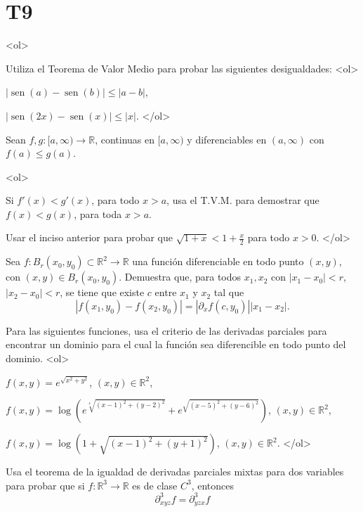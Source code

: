 \documentclass{article}
\theoremstyle{definition}
\newcommand{\sen}{\operatorname{sen}}
\begin{document}
  \section*{T9 }


  <ol>



  \item\label{Ejer:DesigualdadesAplicandoTVM}
    Utiliza el Teorema de Valor Medio para probar las siguientes desigualdades:
<ol>
\item $|\sen(a)-\sen(b)| \leq |a-b|$,
\item $|\sen(2x)-\sen(x)| \leq |x|$.
</ol>


\item Sean $f,g:[a,\infty)\to \mathbb{R}$, continuas en $[a,\infty)$ y diferenciables en $(a,\infty)$ con
$f(a) \leq g(a)$.

<ol>
\item Si $f'(x) < g'(x)$, para todo $x>a$, usa el T.V.M. para demostrar que $f(x) < g(x)$, para toda $x>a$.
\item Usar el inciso anterior para probar que $\sqrt{1+x}< 1+\frac{x}{2}$ para todo $x>0$.
</ol>    
  
\item Sea $f:B_r(x_0,y_0)\subset \mathbb{R}^2 \to \mathbb{R}$ una función diferenciable en todo
  punto $(x,y)$, con $(x,y)\in B_r(x_0,y_0)$. Demuestra que, para todos $x_1,x_2$ con $|x_1-x_0|<r$,
  $|x_2-x_0|<r$, se tiene que existe $c$ entre $x_1$ y $x_2$ tal que
  $$
  |f(x_1,y_0)-f(x_2,y_0)| = |\partial_xf(c,y_0)||x_1-x_2|.
  $$

  \item Para las siguientes funciones, usa el criterio
    de las derivadas parciales para encontrar  un dominio
    para el cual la función sea diferencible en
    todo punto del dominio.
    <ol>
    \item $f(x,y)=e^{\sqrt{x^2+y^2}}$,  $(x,y)\in \mathbb{R}^2$,
    \item $f(x,y)=\log(e^{\sqrt[4]{(x-1)^2+(y-2)^2}}+e^{\sqrt{(x-5)^2+(y-6)^2}})$,
      $(x,y)\in \mathbb{R}^2$,
      \item $f(x,y)=\log(1+\sqrt{(x-1)^2+(y+1)^2})$, $(x,y)\in \mathbb{R}^2$.
    </ol>
    


      \item Usa el teorema de la igualdad de derivadas parciales mixtas
    para dos variables para probar que si $f:\mathbb{R}^3\to \mathbb{R}$
    es de clase $C^3$, entonces
    $$
    \partial^{3}_{xyz}f=\partial_{yzx}^3 f
    $$
\end{document}
